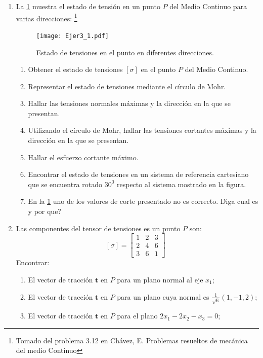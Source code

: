 \documentclass[../notas medios.tex]{subfiles}
\begin{document}
\begin{enumerate}
\item \label{punto01} La \cref{figura2:mala} muestra el estado de tensión
en un punto $P$ del Medio Continuo para varias direcciones: \footnote{Tomado del problema 3.12 en Chávez, E. Problemas resueltos de mecánica del medio Continuo}

\begin{figure}[H]
	\centering
	\texttt{[image: Ejer3\_1.pdf]}
	\caption{Estado de tensiones en el punto en diferentes direcciones.}
	\label{figura2:mala}
\end{figure}
\begin{enumerate}
	\item Obtener el estado de tensiones $[\sigma]$ en el punto $P$ del Medio
	Continuo.
	\item Representar el estado de tensiones mediante el c\'irculo de Mohr.
	\item Hallar las tensiones normales m\'aximas y la direcci\'on en la que se presentan.
	\item Utilizando el círculo de Mohr, hallar las tensiones cortantes m\'aximas y la direcci\'on en la que se presentan.
	\item Hallar el esfuerzo cortante m\'aximo.
	\item Encontrar el estado de tensiones en un sistema de referencia cartesiano que se encuentra rotado $30^{0}$ respecto al sistema mostrado en la figura.
	\item En la  \cref{figura2:mala} uno de los valores de corte presentado no es correcto. \textquestiondown  Diga cual es y por que?
\end{enumerate}

\item \label{punto02} Las componentes del tensor de tensiones es un punto $P$
son:
		\[{[\sigma]} = \left[ \begin{array}{ccc}
		1 & 2 & 3 \\ 
		2 & 4 & 6 \\ 
		3 & 6 & 1
		\end{array}  \right] \enspace\]
%
Encontrar:
%
\begin{enumerate}
	\item El vector de tracci\'on $\mathbf{t}$ en $P$ para un plano normal al eje $x_1$;
	\item El vector de tracci\'on $\mathbf{t}$ en $P$ para un plano cuya normal es $\frac{1}{\sqrt{6}}(1,-1,2)$;
	\item El vector de tracci\'on $\mathbf{t}$ en $P$ para el plano $2x_1 - 2x_2 - x_3 = 0$;
\end{enumerate}


\end{enumerate}
\end{document}
